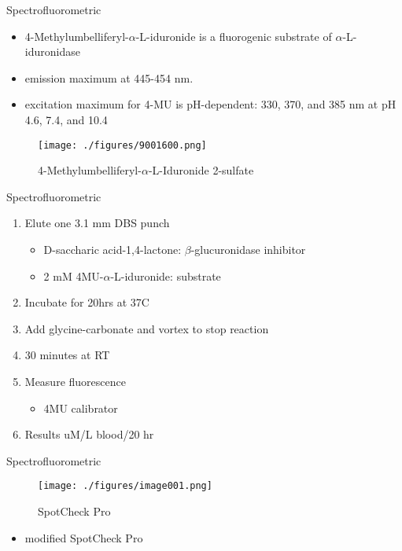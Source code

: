 \documentclass[presentation, smaller]{beamer}
\begin{document}
\begin{frame}[label={sec:orgheadline10}]{Spectrofluorometric}
\begin{itemize}
\item 4-Methylumbelliferyl-\(\alpha\)-L-iduronide is a fluorogenic substrate of \(\alpha\)-L-iduronidase
\item emission maximum at 445-454 nm.
\item excitation maximum for 4-MU is pH-dependent: 330, 370, and 385 nm at pH 4.6, 7.4, and 10.4
\end{itemize}

\begin{figure}[htb]
\centering
\texttt{[image: ./figures/9001600.png]}
\caption[4MUI]{\label{fig:4mui}
4-Methylumbelliferyl-\(\alpha\)-L-Iduronide 2-sulfate}
\end{figure}
\end{frame}


\begin{frame}[label={sec:orgheadline11}]{Spectrofluorometric}
\begin{enumerate}
\item Elute one 3.1 mm DBS punch
\begin{itemize}
\item D-saccharic acid-1,4-lactone: \(\beta\)-glucuronidase inhibitor
\item 2 mM 4MU-\(\alpha\)-L-iduronide: substrate
\end{itemize}
\item Incubate for 20hrs at 37\degree C
\item Add glycine-carbonate and vortex to stop reaction
\item 30 minutes at RT
\item Measure fluorescence
\begin{itemize}
\item 4MU calibrator
\end{itemize}
\item Results uM/L blood/20 hr
\end{enumerate}
\end{frame}


\begin{frame}[label={sec:orgheadline12}]{Spectrofluorometric}
\begin{figure}[htb]
\centering
\texttt{[image: ./figures/image001.png]}
\caption{\label{fig:ap}
SpotCheck Pro}
\end{figure}

\begin{itemize}
\item modified SpotCheck Pro
\end{itemize}
\end{frame}
\end{document}
